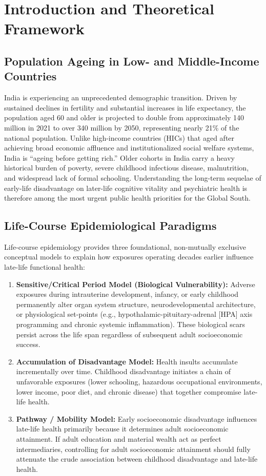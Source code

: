 \documentclass[11pt,a4paper]{article}
\begin{document}
\section{Introduction and Theoretical Framework}

\subsection{Population Ageing in Low- and Middle-Income Countries}
India is experiencing an unprecedented demographic transition. Driven by sustained declines in fertility and substantial increases in life expectancy, the population aged 60 and older is projected to double from approximately 140 million in 2021 to over 340 million by 2050, representing nearly 21\% of the national population. Unlike high-income countries (HICs) that aged after achieving broad economic affluence and institutionalized social welfare systems, India is ``ageing before getting rich.'' Older cohorts in India carry a heavy historical burden of poverty, severe childhood infectious disease, malnutrition, and widespread lack of formal schooling. Understanding the long-term sequelae of early-life disadvantage on later-life cognitive vitality and psychiatric health is therefore among the most urgent public health priorities for the Global South.

\subsection{Life-Course Epidemiological Paradigms}
Life-course epidemiology provides three foundational, non-mutually exclusive conceptual models to explain how exposures operating decades earlier influence late-life functional health:
\begin{enumerate}[label=(\alph*)]
    \item \textbf{Sensitive/Critical Period Model (Biological Vulnerability):} Adverse exposures during intrauterine development, infancy, or early childhood permanently alter organ system structure, neurodevelopmental architecture, or physiological set-points (e.g., hypothalamic-pituitary-adrenal [HPA] axis programming and chronic systemic inflammation). These biological scars persist across the life span regardless of subsequent adult socioeconomic success.
    \item \textbf{Accumulation of Disadvantage Model:} Health insults accumulate incrementally over time. Childhood disadvantage initiates a chain of unfavorable exposures (lower schooling, hazardous occupational environments, lower income, poor diet, and chronic disease) that together compromise late-life health.
    \item \textbf{Pathway / Mobility Model:} Early socioeconomic disadvantage influences late-life health primarily because it determines adult socioeconomic attainment. If adult education and material wealth act as perfect intermediaries, controlling for adult socioeconomic attainment should fully attenuate the crude association between childhood disadvantage and late-life health.
\end{enumerate}
\end{document}
